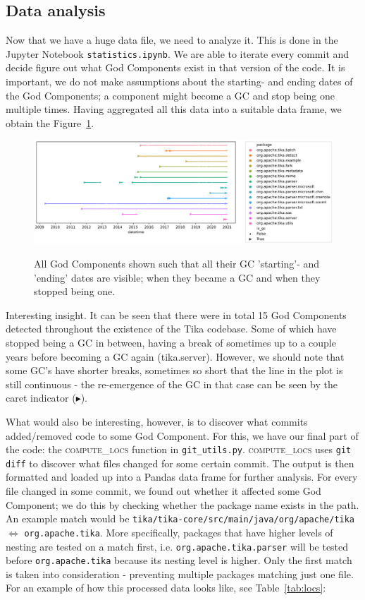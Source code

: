 \documentclass{article}
\begin{document}
\subsection{Data analysis}
Now that we have a huge data file, we need to analyze it. This is done in the Jupyter Notebook \texttt{statistics.ipynb}. We are able to iterate every commit and decide figure out what God Components exist in that version of the code. It is important, we do not make assumptions about the starting- and ending dates of the God Components; a component might become a GC and stop being one multiple times. Having aggregated all this data into a suitable data frame, we obtain the Figure~\ref{fig:gc_lineplot}.

\begin{figure}[ht]
    \centering
    \includegraphics[width=\textwidth]{report/images/gc_lineplot.png}
    \label{fig:gc_lineplot}
    \caption{All God Components shown such that all their GC 'starting'- and 'ending' dates are visible; when they became a GC and when they stopped being one.}
\end{figure}

Interesting insight. It can be seen that there were in total 15 God Components detected throughout the existence of the Tika codebase. Some of which have stopped being a GC in between, having a break of sometimes up to a couple years before becoming a GC again (tika.server). However, we should note that some GC's have shorter breaks, sometimes so short that the line in the plot is still continuous - the re-emergence of the GC in that case can be seen by the caret indicator ($\blacktriangleright$).

What would also be interesting, however, is to discover what commits added/removed code to some God Component. For this, we have our final part of the code: the \textsc{compute\_locs} function in \texttt{git\_utils.py}. \textsc{compute\_locs} uses \texttt{git diff} to discover what files changed for some certain commit. The output is then formatted and loaded up into a Pandas data frame for further analysis. For every file changed in some commit, we found out whether it affected some God Component; we do this by checking whether the package name exists in the path. An example match would be \texttt{tika/tika-core/src/main/java/org/apache/tika} $\Leftrightarrow$ \texttt{org.apache.tika}. More specifically, packages that have higher levels of nesting are tested on a match first, i.e. \texttt{org.apache.tika.parser} will be tested before \texttt{org.apache.tika} because its nesting level is higher. Only the first match is taken into consideration - preventing multiple packages matching just one file. For an example of how this processed data looks like, see Table~\ref{tab:locs}:
\end{document}
